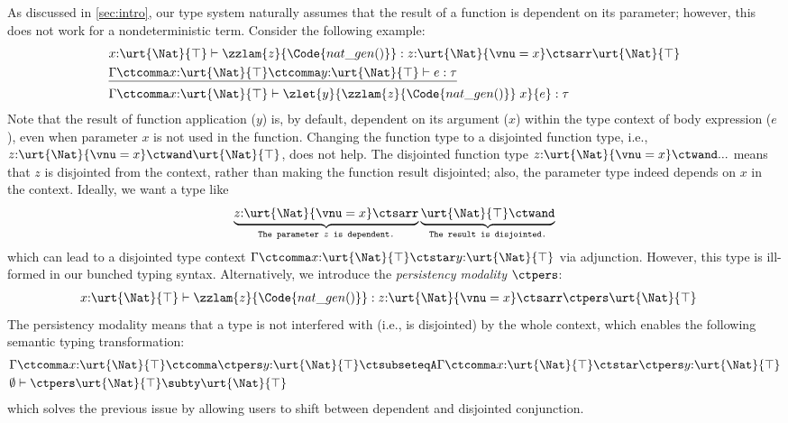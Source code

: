 As discussed in \autoref{sec:intro}, our type system naturally assumes that the result of a function is dependent on its parameter; however, this does not work for a nondeterministic term. Consider the following example:
\begin{align*}
  &x{:}\urt{\Nat}{\top} \vdash \zzlam{z}{\Code{nat\_gen()}} : z{:}\urt{\Nat}{\vnu = x} \ctsarr \urt{\Nat}{\top}
  \\&\underline{\Gamma \ctcomma x{:}\urt{\Nat}{\top} \ctcomma y{:}\urt{\Nat}{\top} \vdash e : \tau}
  \\&\Gamma \ctcomma x{:}\urt{\Nat}{\top} \vdash \zlet{y}{\zzlam{z}{\Code{nat\_gen()}}\;x}{e} : \tau
\end{align*}\noindent
Note that the result of function application ($y$) is, by default, dependent on its argument ($x$) within the type context of body expression ($e$), even when parameter $x$ is not used in the function. Changing the function type to a disjointed function type, i.e., $z{:}\urt{\Nat}{\vnu = x} \ctwand \urt{\Nat}{\top}$, does not help. The disjointed function type $z{:}\urt{\Nat}{\vnu = x} \ctwand ...$ means that $z$ is disjointed from the context, rather than making the function result disjointed; also, the parameter type indeed depends on $x$ in the context. Ideally, we want a type like
\begin{align*}
  \underbrace{z{:}\urt{\Nat}{\vnu = x} \ctsarr}_\texttt{The parameter $z$ is dependent.} \underbrace{\urt{\Nat}{\top} \ctwand}_\texttt{The result is disjointed.}
\end{align*}\noindent
which can lead to a disjointed type context $\Gamma \ctcomma x{:}\urt{\Nat}{\top} \ctstar y{:}\urt{\Nat}{\top}$ via adjunction.
However, this type is ill-formed in our bunched typing syntax. Alternatively, we introduce the \emph{persistency modality} $\ctpers$:
\begin{align*}
  &x{:}\urt{\Nat}{\top} \vdash \zzlam{z}{\Code{nat\_gen()}} : z{:}\urt{\Nat}{\vnu = x} \ctsarr \ctpers \urt{\Nat}{\top}
\end{align*}\noindent
The persistency modality means that a type is not interfered with (i.e., is disjointed) by the whole context, which enables the following semantic typing transformation:
\begin{align*}
  &\Gamma \ctcomma x{:}\urt{\Nat}{\top} \ctcomma \ctpers y{:}\urt{\Nat}{\top} \ctsubseteqA \Gamma \ctcomma x{:}\urt{\Nat}{\top} \ctstar \ctpers y{:}\urt{\Nat}{\top}
  \\&\emptyset \vdash \ctpers \urt{\Nat}{\top} \subty \urt{\Nat}{\top} 
\end{align*}\noindent
which solves the previous issue by allowing users to shift between dependent and disjointed conjunction.

